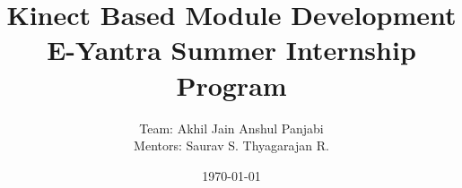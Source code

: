 \documentclass[20pt]{report}
\begin{document}
\title{\textbf{\LARGE{Kinect Based Module Development} \vspace{0.3in} \\  E-Yantra Summer Internship  Program}}
\author{Team:\hspace{0.1in} Akhil Jain \hspace{0.2in} Anshul Panjabi \\ \vspace{0.2in}  Mentors: \vspace{0.05in} Saurav S. \hspace{0.2in} Thyagarajan R.}

\date{\today}

\maketitle

\tableofcontents





\end{document}
